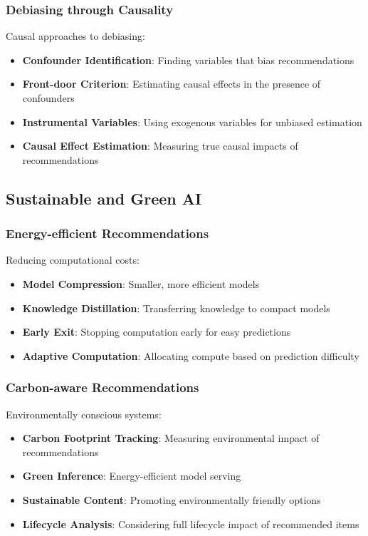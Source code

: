 \subsubsection{Debiasing through Causality}

Causal approaches to debiasing:
\begin{itemize}
    \item \textbf{Confounder Identification}: Finding variables that bias recommendations
    \item \textbf{Front-door Criterion}: Estimating causal effects in the presence of confounders
    \item \textbf{Instrumental Variables}: Using exogenous variables for unbiased estimation
    \item \textbf{Causal Effect Estimation}: Measuring true causal impacts of recommendations
\end{itemize}

\subsection{Sustainable and Green AI}

\subsubsection{Energy-efficient Recommendations}

Reducing computational costs:
\begin{itemize}
    \item \textbf{Model Compression}: Smaller, more efficient models
    \item \textbf{Knowledge Distillation}: Transferring knowledge to compact models
    \item \textbf{Early Exit}: Stopping computation early for easy predictions
    \item \textbf{Adaptive Computation}: Allocating compute based on prediction difficulty
\end{itemize}

\subsubsection{Carbon-aware Recommendations}

Environmentally conscious systems:
\begin{itemize}
    \item \textbf{Carbon Footprint Tracking}: Measuring environmental impact of recommendations
    \item \textbf{Green Inference}: Energy-efficient model serving
    \item \textbf{Sustainable Content}: Promoting environmentally friendly options
    \item \textbf{Lifecycle Analysis}: Considering full lifecycle impact of recommended items
\end{itemize}


